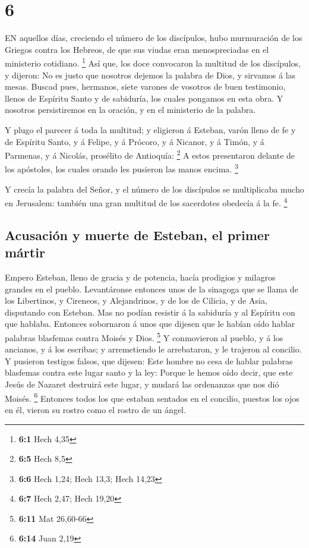 \hypertarget{section-5}{%
\section{6}\label{section-5}}

 EN aquellos días, creciendo el número de los discípulos,
hubo murmuración de los Griegos contra los Hebreos, de que sus viudas
eran menospreciadas en el ministerio cotidiano. \footnote{\textbf{6:1}
  Hech 4,35}  Así que, los doce convocaron la multitud de
los discípulos, y dijeron: No es justo que nosotros dejemos la palabra
de Dios, y sirvamos á las mesas.  Buscad pues, hermanos,
siete varones de vosotros de buen testimonio, llenos de Espíritu Santo y
de sabiduría, los cuales pongamos en esta obra.  Y nosotros
persistiremos en la oración, y en el ministerio de la palabra.

 Y plugo el parecer á toda la multitud; y eligieron á
Esteban, varón lleno de fe y de Espíritu Santo, y á Felipe, y á Prócoro,
y á Nicanor, y á Timón, y á Parmenas, y á Nicolás, prosélito de
Antioquía: \footnote{\textbf{6:5} Hech 8,5}  A estos
presentaron delante de los apóstoles, los cuales orando les pusieron las
manos encima. \footnote{\textbf{6:6} Hech 1,24; Hech 13,3; Hech 14,23}

 Y crecía la palabra del Señor, y el número de los
discípulos se multiplicaba mucho en Jerusalem: también una gran multitud
de los sacerdotes obedecía á la fe. \footnote{\textbf{6:7} Hech 2,47;
  Hech 19,20}

\hypertarget{acusaciuxf3n-y-muerte-de-esteban-el-primer-muxe1rtir}{%
\subsection{Acusación y muerte de Esteban, el primer
mártir}\label{acusaciuxf3n-y-muerte-de-esteban-el-primer-muxe1rtir}}

 Empero Esteban, lleno de gracia y de potencia, hacía
prodigios y milagros grandes en el pueblo.  Levantáronse
entonces unos de la sinagoga que se llama de los Libertinos, y Cireneos,
y Alejandrinos, y de los de Cilicia, y de Asia, disputando con Esteban.
 Mas no podían resistir á la sabiduría y al Espíritu con
que hablaba.  Entonces sobornaron á unos que dijesen que le
habían oído hablar palabras blasfemas contra Moisés y Dios. \footnote{\textbf{6:11}
  Mat 26,60-66}  Y conmovieron al pueblo, y á los ancianos,
y á los escribas; y arremetiendo le arrebataron, y le trajeron al
concilio.  Y pusieron testigos falsos, que dijesen: Este
hombre no cesa de hablar palabras blasfemas contra este lugar santo y la
ley:  Porque le hemos oído decir, que este Jesús de Nazaret
destruirá este lugar, y mudará las ordenanzas que nos dió Moisés.
\footnote{\textbf{6:14} Juan 2,19}  Entonces todos los que
estaban sentados en el concilio, puestos los ojos en él, vieron su
rostro como el rostro de un ángel.

